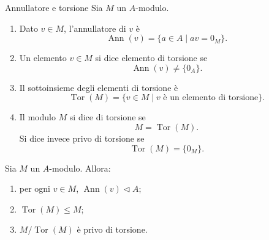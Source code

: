 \documentclass[a4paper]{article}
\begin{document}
\begin{radioactive}
\begin{snippetdefinition}{Annullatore e torsione}
    Sia \(M\) un \(A\)-modulo.

    \begin{enumerate}
        \item Dato \(v\in M\), l'annullatore di \(v\) è
        \[
            \operatorname{Ann}(v)
            =
            \{a\in A\mid av=0_M\}.
        \]

        \item Un elemento \(v\in M\) si dice elemento di torsione se
        \[
            \operatorname{Ann}(v)\neq \{0_A\}.
        \]

        \item Il sottoinsieme degli elementi di torsione è
        \[
            \operatorname{Tor}(M)
            =
            \{v\in M\mid v \text{ è un elemento di torsione}\}.
        \]

        \item Il modulo \(M\) si dice di torsione se
        \[
            M=\operatorname{Tor}(M).
        \]
        Si dice invece privo di torsione se
        \[
            \operatorname{Tor}(M)=\{0_M\}.
        \]
    \end{enumerate}
\end{snippetdefinition}
\end{radioactive}

\begin{radioactive}
\begin{snippetproposition}{}
    Sia \(M\) un \(A\)-modulo. Allora:
    \begin{enumerate}
        \item per ogni \(v\in M\), \(\operatorname{Ann}(v)\triangleleft A\);
        \item \(\operatorname{Tor}(M)\leq M\);
        \item \(M/\operatorname{Tor}(M)\) è privo di torsione.
    \end{enumerate}
\end{snippetproposition}
\end{radioactive}
\end{document}
